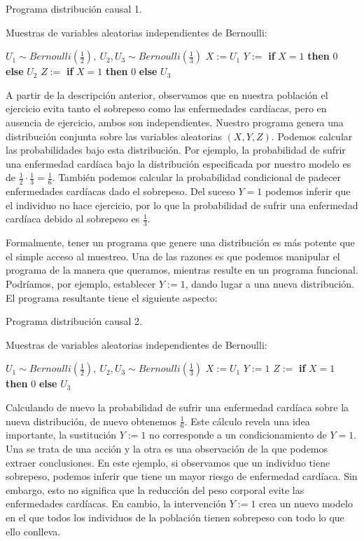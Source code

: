 \documentclass[oneside,openright,titlepage,numbers=noenddot,openany,headinclude,footinclude=true,
cleardoublepage=empty,abstractoff,BCOR=5mm,paper=a4,fontsize=12pt,main=spanish]{scrreprt}
\begin{document}
\clearpage

\begin{algorithm}[h]
\caption{Programa distribución causal 1.}
    Muestras de variables aleatorias independientes de Bernoulli:
    
    $U_1 \sim  Bernoulli\left(\frac{1}{2}\right), \ U_2,U_3 \sim  Bernoulli\left(\frac{1}{3}\right)$\;
    $X:=U_1$\;
    $Y:=$ \textbf{if} $X=1$ \textbf{then} $0$ \textbf{else} $U_2$\;
    $Z:=$ \textbf{if} $X=1$ \textbf{then} $0$ \textbf{else} $U_3$\;
    \label{alg:programa2}
\end{algorithm}

A partir de la descripción anterior, observamos que en nuestra población el ejercicio evita tanto el sobrepeso como las enfermedades cardíacas, pero en ausencia de ejercicio, ambos son independientes. Nuestro programa genera una distribución conjunta sobre las variables aleatorias $(X, Y, Z)$. Podemos calcular las probabilidades bajo esta distribución. Por ejemplo, la probabilidad de sufrir una enfermedad cardíaca bajo la distribución especificada por nuestro modelo es de $\frac{1}{2}\cdot \frac{1}{3}=\frac{1}{6}$. También podemos calcular la probabilidad condicional de padecer enfermedades cardíacas dado el sobrepeso. Del suceso $Y = 1$ podemos inferir que el individuo no hace ejercicio, por lo que la probabilidad de sufrir una enfermedad cardíaca debido al sobrepeso es $\frac{1}{3}$.

Formalmente, tener un programa que genere una distribución es más potente que el simple acceso al muestreo. Una de las razones es que podemos manipular el programa de la manera que queramos, mientras resulte en un programa funcional. Podríamos, por ejemplo, establecer $Y := 1$, dando lugar a una nueva distribución. El programa resultante tiene el siguiente aspecto:

\begin{algorithm}[h]
\caption{Programa distribución causal 2.}
    Muestras de variables aleatorias independientes de Bernoulli:
    
    $U_1 \sim  Bernoulli\left(\frac{1}{2}\right), \ U_2,U_3 \sim  Bernoulli\left(\frac{1}{3}\right)$\;
    $X:=U_1$\;
    $Y:=1$\;
    $Z:=$ \textbf{if} $X=1$ \textbf{then} $0$ \textbf{else} $U_3$\;
\end{algorithm}

Calculando de nuevo la probabilidad de sufrir una enfermedad cardíaca sobre la nueva distribución, de nuevo obtenemos $\frac{1}{6}$. Este cálculo revela una idea importante, la sustitución $Y := 1$ no corresponde a un condicionamiento de $Y = 1$. Una se trata de una acción y la otra es una observación de la que podemos extraer conclusiones. En este ejemplo, si observamos que un individuo tiene sobrepeso, podemos inferir que tiene un mayor riesgo de enfermedad cardíaca. Sin embargo, esto no significa que la reducción del peso corporal evite las enfermedades cardíacas. En cambio, la intervención $Y := 1$ crea un nuevo modelo en el que todos los individuos de la población tienen sobrepeso con todo lo que ello conlleva.
\end{document}
